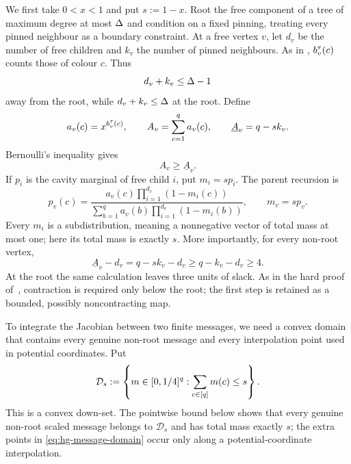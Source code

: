 We first take $0<x<1$ and put $s:=1-x$.  Root the free component of a tree
of maximum degree at most \(\Delta\) and condition on a fixed pinning, treating
every pinned neighbour as a boundary constraint.  At a free vertex $v$, let
$d_v$ be the number of free children and $k_v$ the number of pinned
neighbours.  As in , $b_v^\tau(c)$ counts those of
colour $c$.  Thus
\[
  d_v+k_v\le\Delta-1
\]
away from the root, while $d_v+k_v\le\Delta$ at the root.  Define
\begin{equation}
  a_v(c)=x^{b_v^\tau(c)},\qquad
  A_v=\sum_{c=1}^q a_v(c),\qquad
  \underline A_v=q-sk_v.
  \label{eq:hg-palette-mass}
\end{equation}
Bernoulli's inequality gives
\begin{equation}
  A_v\ge\underline A_v.
  \label{eq:hg-palette-lower}
\end{equation}
If $p_i$ is the cavity marginal of free child $i$, put $m_i=sp_i$.
The parent recursion is
\begin{equation}
  p_v(c)=
  \frac{a_v(c)\prod_{i=1}^{d_v}(1-m_i(c))}
       {\sum_{b=1}^q a_v(b)\prod_{i=1}^{d_v}(1-m_i(b))},
  \qquad m_v=sp_v.
  \label{eq:hg-scaled-recursion}
\end{equation}
Every $m_i$ is a subdistribution, meaning a nonnegative vector of total
mass at most one; here its total mass is exactly $s$.  More importantly,
for every non-root vertex,
\begin{equation}
  \underline A_v-d_v
    =q-sk_v-d_v
    \ge q-k_v-d_v\ge4.
  \label{eq:hg-four-slack}
\end{equation}
At the root the same calculation leaves three units of slack.  As in the hard
proof of~\cite{CLMM2023}, contraction is required only below the root; the
first step is retained as a bounded, possibly noncontracting map.

To integrate the Jacobian between two finite messages, we need a convex
domain that contains every genuine non-root message and every interpolation
point used in potential coordinates.  Put
\begin{equation}
 \mathcal D_s
 :=\left\{m\in[0,1/4]^q:
              \sum_{c\in[q]}m(c)\le s\right\}.
 \label{eq:hg-message-domain}
\end{equation}
This is a convex down-set.  The pointwise bound below shows that every
genuine non-root scaled message belongs to \(\mathcal D_s\) and has
total mass exactly \(s\); the extra points in
\eqref{eq:hg-message-domain} occur only along a potential-coordinate
interpolation.

